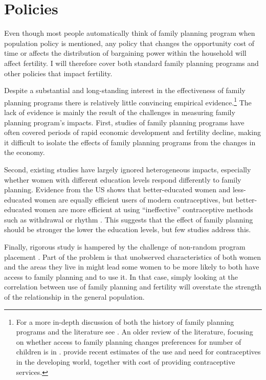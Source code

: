 \documentclass[]{article}
\begin{document}
\section{Policies}\label{policies}

Even though most people automatically think of family planning program when population policy is mentioned, any policy that changes the opportunity cost of time or affects the distribution of bargaining power within the household will affect fertility. I will therefore cover both standard family planning programs and other policies that impact fertility.

Despite a substantial and long-standing interest in the effectiveness of family planning programs there is relatively little convincing empirical evidence.\footnote{For a more in-depth discussion of both the history of family planning programs and the literature see \citet{Miller2016}. An older review of the literature, focusing on whether access to family planning changes preferences for number of children is in \citet{Freedman1997}. \citet{Singh2012} provide recent estimates of the use and need for contraceptives in the developing world, together with cost of providing contraceptive services.} The lack of evidence is mainly the result of the challenges in measuring family planning program's impacts. First, studies of family planning programs have often covered periods of rapid economic development and fertility decline, making it difficult to isolate the effects of family planning programs from the changes in the economy.

Second, existing studies have largely ignored heterogeneous impacts, especially whether women with different education levels respond differently to family planning. Evidence from the US shows that better-educated women and less-educated women are equally efficient users of modern contraceptives, but better-educated women are more efficient at using ``ineffective'' contraceptive methods such as withdrawal or rhythm \citep{Rosenzweig1989}. This suggests that the effect of family planning should be stronger the lower the education levels, but few studies address this.

Finally, rigorous study is hampered by the challenge of non-random program placement \citep{rosenzweig86,pitt93}. Part of the problem is that unobserved characteristics of both women and the areas they live in might lead some women to be more likely to both have access to family planning and to use it. In that case, simply looking at the correlation between use of family planning and fertility will overstate the strength of the relationship in the general population.
\end{document}
